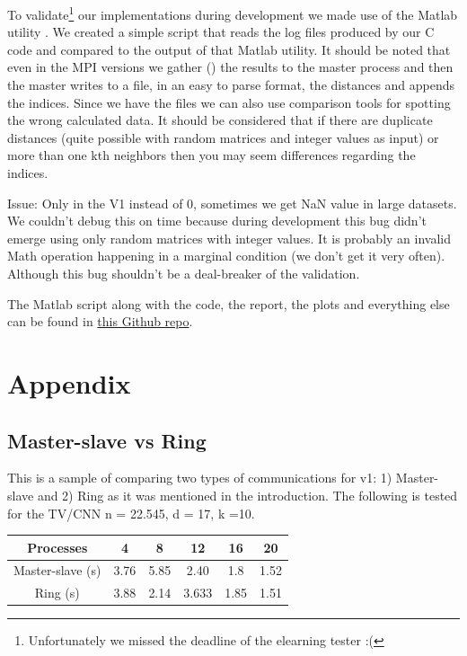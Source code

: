 \documentclass[12pt, a4paper]{article}
\begin{document}
To validate\footnote{Unfortunately we missed the deadline of the elearning tester :(} our implementations during development we made use of the Matlab utility . We created a simple script that reads the log files produced by our C code and compared to the output of that Matlab utility. It should be noted that even in the MPI versions we gather () the results to the master process and then the master writes to a file, in an easy to parse format, the distances and appends the indices. Since we have the files we can also use comparison tools for spotting the wrong calculated data. It should be considered that if there are duplicate distances (quite possible with random matrices and integer values as input) or more than one kth neighbors then you may seem differences regarding the indices. 

Issue: Only in the V1 instead of 0, sometimes we get NaN value in large datasets. We couldn't debug this on time because during development this bug didn't emerge using only random matrices with integer values. It is probably an invalid Math operation happening in a marginal condition (we don't get it very often). Although this bug shouldn't be a deal-breaker of the validation. 

\vspace{0.5cm}
The Matlab script along with the code, the report, the plots and everything else can be found in \href{https://github.com/thodkatz/ece-kNN.git}{this Github repo}.

\section{Appendix}

\subsection{Master-slave vs Ring}
\label{master}

This is a sample of comparing two types of communications for v1: 1) Master-slave and 2) Ring as it was mentioned in the introduction. The following is tested for the TV/CNN n = 22.545, d = 17, k =10.
\begin{table}[h!]
\centering
\begin{tabular}{|c|c|c|c|c|c|}
	\hline
    Processes & 4 & 8 & 12 & 16 & 20  \\
	\hline
    Master-slave (s) & 3.76 & 5.85 & 2.40 & 1.8 & 1.52 \\
	\hline
    Ring (s) &  3.88 & 2.14 & 3.633 & 1.85 & 1.51 \\
	\hline
\end{tabular}
\end{table}
\end{document}

